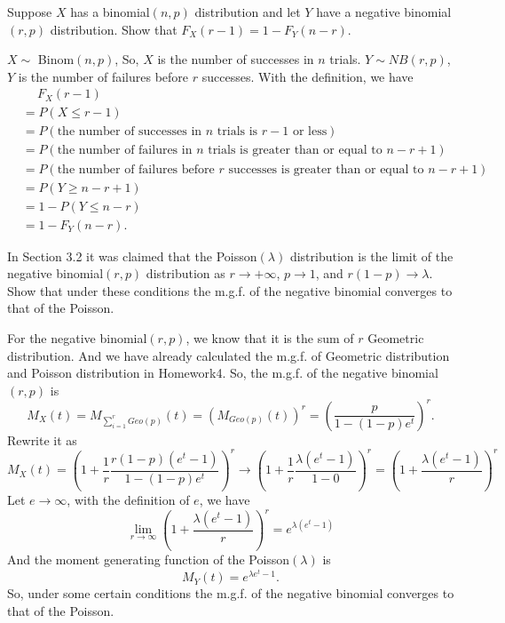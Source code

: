 \documentclass[14pt]{elegantbook}
\begin{document}
    \setcounter{exer}{11}
    \begin{exercise}
        Suppose $X$ has a binomial$(n,p)$ distribution and let $Y$ have a negative binomial$(r,p)$ distribution. Show that $F_X(r - 1)= 1- F_Y(n - r)$. 
    \end{exercise}
    \begin{solution}
        $X\sim$ Binom$(n,p)$, So, $X$ is the number of successes in $n$ trials. $Y\sim NB(r,p)$, $Y$ is the number of failures before $r$ successes. 
        With the definition, we have
        \begin{align*}
            &\quad\ F_X(r-1)\\
            &=P(X\leq r-1)\\
            &=P(\text{the number of successes in $n$ trials is $r-1$ or less})\\
            &=P(\text{the number of failures in $n$ trials is greater than or equal to $n-r+1$})\\
            &=P(\text{the number of failures before $r$ successes is greater than or equal to $n-r+1$})\\
            &=P(Y\geq n-r+1)\\
            &=1-P(Y\leq n-r)\\
            &=1-F_Y(n-r). 
        \end{align*}
    \end{solution}

    \setcounter{exer}{14}
    \begin{exercise}
        In Section 3.2 it was claimed that the Poisson$(\lambda)$ distribution is the limit of the negative binomial$(r,p)$ distribution as $r\to +\infty$, $p \to1$, and $r(1-p)\to \lambda$. Show that under these conditions the m.g.f. of the negative binomial converges to that of the Poisson. 
    \end{exercise}
    \begin{solution}
        For the negative binomial$(r,p)$, we know that it is the sum of $r$ Geometric distribution. And we have already calculated the m.g.f. of Geometric distribution and Poisson distribution in Homework4. So, the m.g.f. of the negative binomial$(r,p)$ is
        \[M_X(t)=M_{\sum_{i=1}^{r}Geo(p)}(t)=\left(M_{Geo(p)}(t)\right)^r=\left(\frac{p}{1-(1-p)e^t}\right)^r. \]
        Rewrite it as
        \[M_X(t)=\left(1+\frac{1}{r}\frac{r(1-p)(e^t-1)}{1-(1-p)e^t}\right)^r\to\left(1+\frac{1}{r}\frac{\lambda(e^t-1)}{1-0}\right)^r=\left(1+\frac{\lambda (e^t-1)}{r}\right)^r\]
        Let $e\to\infty$, with the definition of $e$, we have
        \[\lim_{r\to\infty}\left(1+\frac{\lambda (e^t-1)}{r}\right)^r=e^{\lambda(e^t-1)}\]
        And the moment generating function of the Poisson$(\lambda)$ is
        \[M_Y(t)=e^{\lambda e^{t}-1}. \]
        So, under some certain conditions the m.g.f. of the negative binomial converges to that of the Poisson. 
    \end{solution}
\end{document}
